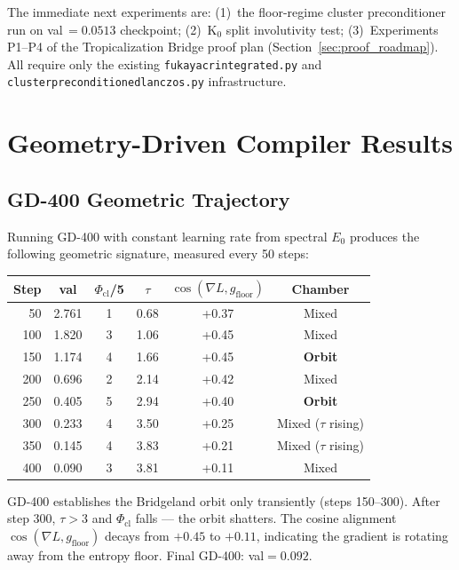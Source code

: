 \documentclass[11pt]{amsart}
\begin{document}
The immediate next experiments are: (1)~the floor-regime
cluster preconditioner run on val\,$=0.0513$ checkpoint;
(2)~K$_0$ split involutivity test; (3)~Experiments P1--P4
of the Tropicalization Bridge proof plan
(Section~\ref{sec:proof_roadmap}).
All require only the existing
\texttt{fukaya\discretionary{\_}{}{\_}cr\discretionary{\_}{}{\_}integrated.py}
and \texttt{cluster\discretionary{\_}{}{\_}preconditioned\discretionary{\_}{}{\_}lanczos.py}
infrastructure.


\section{Geometry-Driven Compiler Results}
\label{sec:results_geometric}

\subsection{GD-400 Geometric Trajectory}

Running GD-400 with constant learning rate from spectral $E_0$ produces the following
geometric signature, measured every 50 steps:

\begin{center}
\small
\begin{tabular}{rccccc}
\toprule
Step & val & $\Phi_\mathrm{cl}$/5 & $\tau$ & $\cos(\nabla L,g_\mathrm{floor})$ & Chamber \\
\midrule
50  & 2.761 & 1 & 0.68 & +0.37 & Mixed \\
100 & 1.820 & 3 & 1.06 & +0.45 & Mixed \\
150 & 1.174 & 4 & 1.66 & +0.45 & \textbf{Orbit} \\
200 & 0.696 & 2 & 2.14 & +0.42 & Mixed \\
250 & 0.405 & 5 & 2.94 & +0.40 & \textbf{Orbit} \\
300 & 0.233 & 4 & 3.50 & +0.25 & Mixed ($\tau$ rising) \\
350 & 0.145 & 4 & 3.83 & +0.21 & Mixed ($\tau$ rising) \\
400 & 0.090 & 3 & 3.81 & +0.11 & Mixed \\
\bottomrule
\end{tabular}
\end{center}

GD-400 establishes the Bridgeland orbit only transiently (steps 150--300).
After step 300, $\tau > 3$ and $\Phi_\mathrm{cl}$ falls --- the orbit shatters.
The cosine alignment $\cos(\nabla L, g_\mathrm{floor})$ decays from $+0.45$
to $+0.11$, indicating the gradient is rotating away from the entropy floor.
Final GD-400: val$=0.092$.
\end{document}
